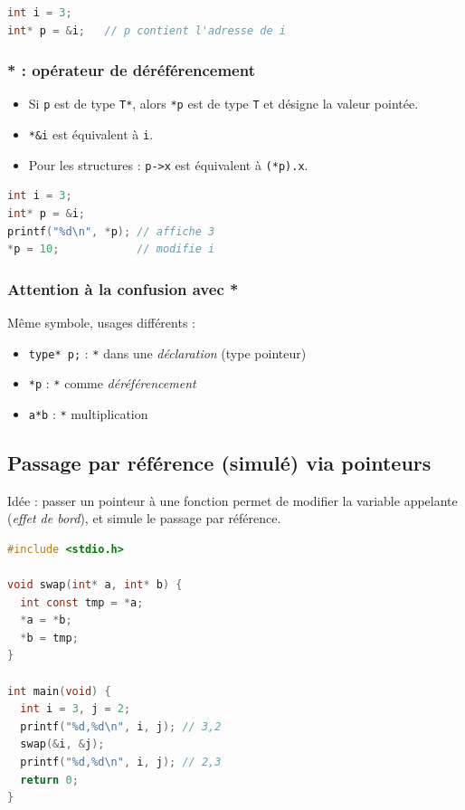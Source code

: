 \begin{lstlisting}[language=C]
int i = 3;
int* p = &i;   // p contient l'adresse de i
\end{lstlisting}

\subsubsection{* : opérateur de déréférencement}
\begin{itemize}
  \item Si \texttt{p} est de type \texttt{T*}, alors \texttt{*p} est de type \texttt{T} et désigne la valeur pointée. 
  \item \texttt{*&i} est équivalent à \texttt{i}.   \item Pour les 
    structures : \texttt{p->x} est équivalent à \texttt{(*p).x}. 
\end{itemize}

\begin{lstlisting}[language=C]
int i = 3;
int* p = &i;
printf("%d\n", *p); // affiche 3
*p = 10;            // modifie i
\end{lstlisting}

\subsubsection{Attention à la confusion avec *}
Même symbole, usages différents : 
\begin{itemize}
  \item \texttt{type* p;} : \texttt{*} dans une \emph{déclaration} (type pointeur)
  \item \texttt{*p} : \texttt{*} comme \emph{déréférencement}
  \item \texttt{a*b} : \texttt{*} multiplication
\end{itemize}

\subsection{Passage par référence (simulé) via pointeurs}
Idée : passer un pointeur à une fonction permet de modifier la variable appelante
(\emph{effet de bord}), et simule le passage par référence. 

\begin{lstlisting}[language=C]
#include <stdio.h>

void swap(int* a, int* b) {
  int const tmp = *a;
  *a = *b;
  *b = tmp;
}

int main(void) {
  int i = 3, j = 2;
  printf("%d,%d\n", i, j); // 3,2
  swap(&i, &j);
  printf("%d,%d\n", i, j); // 2,3
  return 0;
}
\end{lstlisting}

